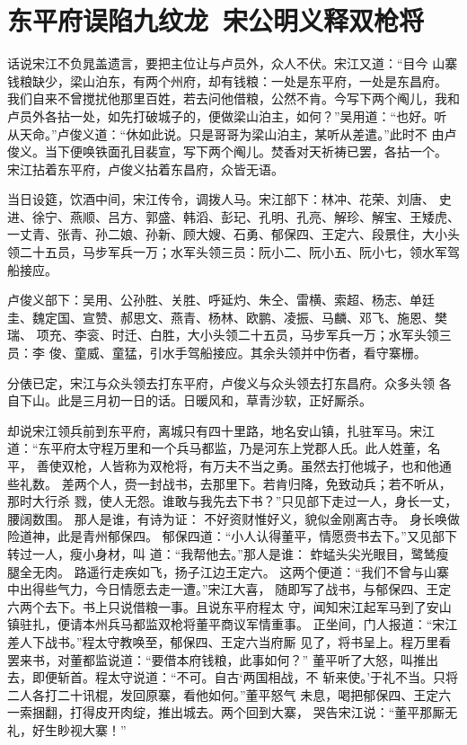 \chapter{东平府误陷九纹龙~宋公明义释双枪将}

话说宋江不负晁盖遗言，要把主位让与卢员外，众人不伏。宋江又道：“目今
山寨钱粮缺少，梁山泊东，有两个州府，却有钱粮：一处是东平府，一处是东昌府。
我们自来不曾搅扰他那里百姓，若去问他借粮，公然不肯。今写下两个阄儿，我和
卢员外各拈一处，如先打破城子的，便做梁山泊主，如何？”吴用道：“也好。听
从天命。”卢俊义道：“休如此说。只是哥哥为梁山泊主，某听从差遣。”此时不
由卢俊义。当下便唤铁面孔目裴宣，写下两个阄儿。焚香对天祈祷已罢，各拈一个。
宋江拈着东平府，卢俊义拈着东昌府，众皆无语。

当日设筵，饮酒中间，宋江传令，调拨人马。宋江部下：林冲、花荣、刘唐、
史进、徐宁、燕顺、吕方、郭盛、韩滔、彭玘、孔明、孔亮、解珍、解宝、王矮虎、
一丈青、张青、孙二娘、孙新、顾大嫂、石勇、郁保四、王定六、段景住，大小头
领二十五员，马步军兵一万；水军头领三员：阮小二、阮小五、阮小七，领水军驾
船接应。

卢俊义部下：吴用、公孙胜、关胜、呼延灼、朱仝、雷横、索超、杨志、单廷
圭、魏定国、宣赞、郝思文、燕青、杨林、欧鹏、凌振、马麟、邓飞、施恩、樊瑞、
项充、李衮、时迁、白胜，大小头领二十五员，马步军兵一万；水军头领三员：李
俊、童威、童猛，引水手驾船接应。其余头领并中伤者，看守寨栅。

分俵已定，宋江与众头领去打东平府，卢俊义与众头领去打东昌府。众多头领
各自下山。此是三月初一日的话。日暖风和，草青沙软，正好厮杀。

却说宋江领兵前到东平府，离城只有四十里路，地名安山镇，扎驻军马。宋江
道：“东平府太守程万里和一个兵马都监，乃是河东上党郡人氏。此人姓董，名平，
善使双枪，人皆称为双枪将，有万夫不当之勇。虽然去打他城子，也和他通些礼数。
差两个人，赍一封战书，去那里下。若肯归降，免致动兵；若不听从，那时大行杀
戮，使人无怨。谁敢与我先去下书？”只见部下走过一人，身长一丈，腰阔数围。
那人是谁，有诗为证：
不好资财惟好义，貌似金刚离古寺。
身长唤做险道神，此是青州郁保四。
郁保四道：“小人认得董平，情愿赍书去下。”又见部下转过一人，瘦小身材，叫
道：“我帮他去。”那人是谁：
蚱蜢头尖光眼目，鹭鸶瘦腿全无肉。
路遥行走疾如飞，扬子江边王定六。
这两个便道：“我们不曾与山寨中出得些气力，今日情愿去走一遭。”宋江大喜，
随即写了战书，与郁保四、王定六两个去下。书上只说借粮一事。且说东平府程太
守，闻知宋江起军马到了安山镇驻扎，便请本州兵马都监双枪将董平商议军情重事。
正坐间，门人报道：“宋江差人下战书。”程太守教唤至，郁保四、王定六当府厮
见了，将书呈上。程万里看罢来书，对董都监说道：“要借本府钱粮，此事如何？”
董平听了大怒，叫推出去，即便斩首。程太守说道：“不可。自古‘两国相战，不
斩来使。’于礼不当。只将二人各打二十讯棍，发回原寨，看他如何。”董平怒气
未息，喝把郁保四、王定六一索捆翻，打得皮开肉绽，推出城去。两个回到大寨，
哭告宋江说：“董平那厮无礼，好生眇视大寨！”

